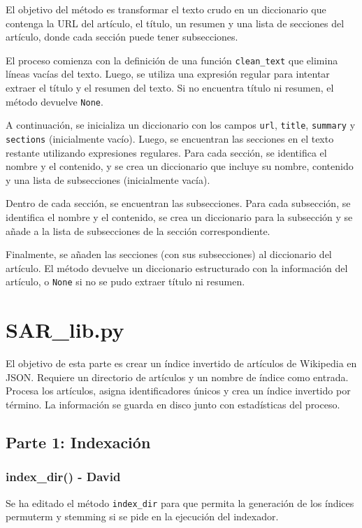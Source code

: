 \documentclass[12pt,a4paper]{article}
\begin{document}
El objetivo del método es transformar el texto crudo en un diccionario que contenga la URL del artículo, el título, un resumen y una lista de secciones del artículo, donde cada sección puede tener subsecciones.

El proceso comienza con la definición de una función \texttt{clean\_text} que elimina líneas vacías del texto. Luego, se utiliza una expresión regular para intentar extraer el título y el resumen del texto. Si no encuentra título ni resumen, el método devuelve \texttt{None}.

A continuación, se inicializa un diccionario con los campos \texttt{url}, \texttt{title}, \texttt{summary} y \texttt{sections} (inicialmente vacío). Luego, se encuentran las secciones en el texto restante utilizando expresiones regulares. Para cada sección, se identifica el nombre y el contenido, y se crea un diccionario que incluye su nombre, contenido y una lista de subsecciones (inicialmente vacía).

Dentro de cada sección, se encuentran las subsecciones. Para cada subsección, se identifica el nombre y el contenido, se crea un diccionario para la subsección y se añade a la lista de subsecciones de la sección correspondiente.

Finalmente, se añaden las secciones (con sus subsecciones) al diccionario del artículo. El método devuelve un diccionario estructurado con la información del artículo, o \texttt{None} si no se pudo extraer título ni resumen.

\section{SAR\_lib.py}

El objetivo de esta parte es crear un índice invertido de artículos de Wikipedia en JSON. Requiere un directorio de artículos y un nombre de índice como entrada. Procesa los artículos, asigna identificadores únicos y crea un índice invertido por término. La información se guarda en disco junto con estadísticas del proceso.

\subsection{Parte 1: Indexación}
\subsubsection{index\_dir() - David}
Se ha editado el método \texttt{index\_dir} para que permita la generación de los índices permuterm y stemming si se pide en la ejecución del indexador.
\end{document}
